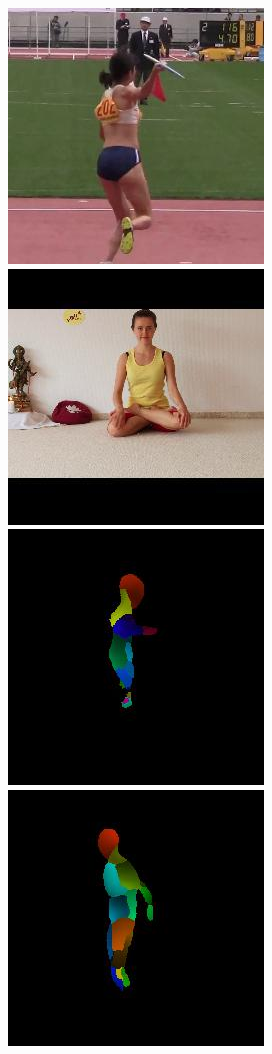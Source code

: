 \begin{figure}[t!]
    \hfill
    \includegraphics[height=\flowhh]{Figures/pose/qualitative/view/view_img_10}
    \hfill
    \includegraphics[height=\flowhh]{Figures/pose/qualitative/view/view_img_127}
    \\
    \includegraphics[height=\flowhh]{Figures/pose/qualitative/view/view_iuv_00}
    \hfill
    \includegraphics[height=\flowhh]{Figures/pose/qualitative/view/view_iuv_02}

\end{figure}
